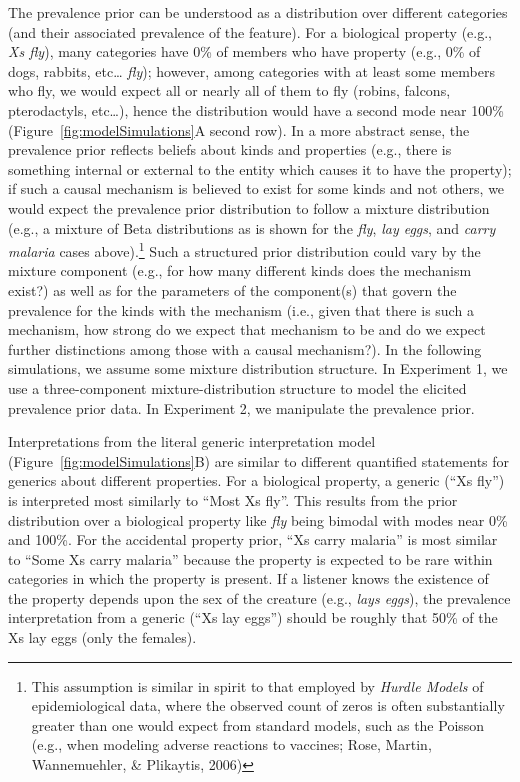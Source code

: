 \documentclass[floatsintext,doc]{apa6}
\let\rmarkdownfootnote\footnote%
\def\footnote{\protect\rmarkdownfootnote}
\begin{document}
The prevalence prior can be understood as a distribution over different categories (and their associated prevalence of the feature).
For a biological property (e.g., \emph{Xs fly}), many categories have 0\% of members who have property (e.g., 0\% of dogs, rabbits, etc\ldots{} \emph{fly}); however, among categories with at least some members who fly, we would expect all or nearly all of them to fly (robins, falcons, pterodactyls, etc\ldots{}), hence the distribution would have a second mode near 100\% (Figure~\ref{fig:modelSimulations}A second row).
In a more abstract sense, the prevalence prior reflects beliefs about kinds and properties (e.g., there is something internal or external to the entity which causes it to have the property); if such a causal mechanism is believed to exist for some kinds and not others, we would expect the prevalence prior distribution to follow a mixture distribution (e.g., a mixture of Beta distributions as is shown for the \emph{fly}, \emph{lay eggs}, and \emph{carry malaria} cases above).\footnote{This assumption is similar in spirit to that employed by \emph{Hurdle Models} of epidemiological data, where the observed count of zeros is often substantially greater than one would expect from standard models, such as the Poisson (e.g., when modeling adverse reactions to vaccines; Rose, Martin, Wannemuehler, \& Plikaytis, 2006)}
Such a structured prior distribution could vary by the mixture component (e.g., for how many different kinds does the mechanism exist?) as well as for the parameters of the component(s) that govern the prevalence for the kinds with the mechanism (i.e., given that there is such a mechanism, how strong do we expect that mechanism to be and do we expect further distinctions among those with a causal mechanism?).
In the following simulations, we assume some mixture distribution structure.
In Experiment 1, we use a three-component mixture-distribution structure to model the elicited prevalence prior data.
In Experiment 2, we manipulate the prevalence prior.

Interpretations from the literal generic interpretation model (Figure~\ref{fig:modelSimulations}B) are similar to different quantified statements for generics about different properties.
For a biological property, a generic (\enquote{Xs fly}) is interpreted most similarly to \enquote{Most Xs fly}.
This results from the prior distribution over a biological property like \emph{fly} being bimodal with modes near 0\% and 100\%.
For the accidental property prior, \enquote{Xs carry malaria} is most similar to \enquote{Some Xs carry malaria} because the property is expected to be rare within categories in which the property is present.
If a listener knows the existence of the property depends upon the sex of the creature (e.g., \emph{lays eggs}), the prevalence interpretation from a generic (\enquote{Xs lay eggs}) should be roughly that 50\% of the Xs lay eggs (only the females).
\end{document}
